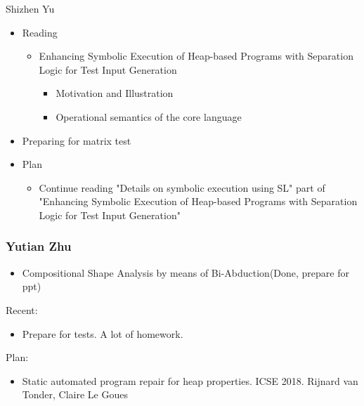 \documentclass[aspectratio=1610, 13pt]{beamer}
\newcommand{\buchi}{B\"uchi }
\begin{document}
\begin{frame}{Shizhen Yu}
    \begin{itemize}
        \item  Reading
        \begin{itemize}
            \item  Enhancing Symbolic Execution of Heap-based Programs with Separation Logic for Test Input Generation
            \begin{itemize}
            \item Motivation and Illustration
            \item Operational semantics of the core language
            \end{itemize}
        \end{itemize}
        \item Preparing for matrix test
        
        
        \item Plan
        \begin{itemize}
            \item Continue reading "Details on symbolic execution using SL" part of "Enhancing Symbolic Execution of Heap-based Programs with Separation Logic for Test Input Generation"  
        \end{itemize}
    \end{itemize}
    
\end{frame}

\begin{frame}
  \frametitle{Yutian Zhu}
  \begin{itemize}
      \item Compositional Shape Analysis by means of Bi-Abduction(Done, prepare for ppt)
  \end{itemize}
  Recent:
  \begin{itemize}
    \item Prepare for tests. A lot of homework.
  \end{itemize}
  Plan:
  \begin{itemize}
    \item Static automated program repair for heap properties. ICSE 2018. Rijnard van Tonder, Claire Le Goues
\end{itemize}  

\end{frame}
\end{document}

